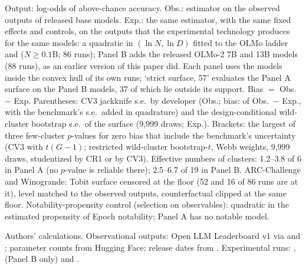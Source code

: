 \begin{table}[tp]
\begin{tablenotes}
Output: log-odds of above-chance accuracy. Obs.: estimator on the observed outputs of released base models. Exp.: the same estimator, with the same fixed effects and controls, on the outputs that the experimental technology produces for the same models: a quadratic in $(\ln N,\ln D)$ fitted to the OLMo ladder and \citet{gadre2024language} ($N\geq0.1$B; 86 runs); Panel B adds the released OLMo-2 7B and 13B models (88 runs), as an earlier version of this paper did. Each panel uses the models inside the convex hull of its own runs; `strict surface, 57' evaluates the Panel A surface on the Panel B models, 37 of which lie outside its support. Bias $=$ Obs.\ $-$ Exp. Parentheses: CV3 jackknife s.e.\ by developer (Obs.; bias: of Obs.\ $-$ Exp., with the benchmark's s.e.\ added in quadrature) and the design-conditional wild-cluster bootstrap s.e.\ of the surface (9,999 draws; Exp.). Brackets: the largest of three few-cluster $p$-values for zero bias that include the benchmark's uncertainty (CV3 with $t(G-1)$; restricted wild-cluster bootstrap-$t$, Webb weights, 9,999 draws, studentized by CR1 or by CV3). Effective numbers of clusters: 1.2--3.8 of 6 in Panel A (no $p$-value is reliable there); 2.5--6.7 of 19 in Panel B. ARC-Challenge and Winogrande: Tobit surface censored at the floor (52 and 16 of 86 runs are at it), level matched to the observed outputs, counterfactual clipped at the same floor. Notability-propensity control (selection on observables): quadratic in the estimated propensity of Epoch notability; Panel A has no notable model.
\end{tablenotes}
\begin{tablenotes}[Source]
Authors' calculations. Observational outputs: Open LLM Leaderboard v1 via \citet{ruan2024observational} and \citet{maiapolo2024sloth}; parameter counts from Hugging Face; release dates from \citet{epochai2026data}. Experimental runs: \citet{bhagia2024establishing}, \citet{teamolmo2024olmo} (Panel B only) and \citet{gadre2024language}.
\end{tablenotes}
\end{table}
